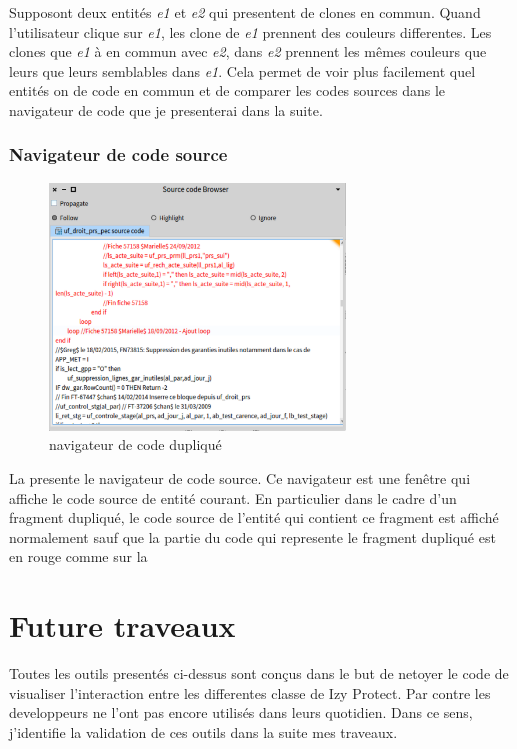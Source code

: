 \documentclass[a4paper]{article}
\begin{document}
Supposont deux entités \textit{e1} et \textit{e2} qui presentent de clones en commun.
Quand l'utilisateur clique sur \textit{e1}, les clone de \textit{e1} prennent des couleurs differentes.
Les clones que \textit{e1} à en commun avec \textit{e2}, dans \textit{e2} prennent les mêmes couleurs que leurs que leurs semblables dans \textit{e1}.
Cela permet de voir plus facilement quel entités on de code en commun et de comparer les codes sources dans le navigateur de code que je presenterai dans la suite. 

\subsubsection{Navigateur de code source}

\begin{figure}[htbp]
  \begin{center}
  \includegraphics[width=0.7\textwidth]{./figures/sourceCodeBrowser.png}
  \caption{navigateur de code dupliqué}
  \label{fig:sourceCodeBrowser}
\end{center}
\vspace{-0.3cm}
\end{figure}
La  presente le navigateur de code source. 
Ce navigateur est une fenêtre qui affiche le code source de entité courant.
En particulier dans le cadre d'un fragment dupliqué, le code source de l'entité qui contient ce fragment est affiché normalement sauf que la partie du code qui represente le fragment dupliqué est en rouge 
comme sur la 

\section{Future traveaux}
\label{sec:roadmap}
Toutes les outils presentés ci-dessus sont conçus dans le but de netoyer le code de visualiser l'interaction entre les differentes classe de Izy Protect.
Par contre les developpeurs ne l'ont pas encore utilisés dans leurs quotidien.
Dans ce sens, j'identifie la validation de ces outils dans la suite mes traveaux.
\end{document}
